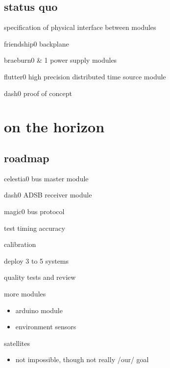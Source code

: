 \subsection{status quo}
  \begin{frame}{specification of physical interface between modules}
	\end{frame}
	\begin{frame}{friendship0 backplane}
	\end{frame}
	\begin{frame}{braeburn0 \& 1 power supply modules}
	\end{frame}
	\begin{frame}{flutter0 high precision distributed time source module}
	\end{frame}
	\begin{frame}{dash0 proof of concept}
	\end{frame}

\section{on the horizon}	

\subsection{roadmap}
	\begin{frame}{celestia0 bus master module}
	\end{frame}
	\begin{frame}{dash0 ADSB receiver module}
	\end{frame}
	\begin{frame}{magic0 bus protocol}
	\end{frame}
	\begin{frame}{test timing accuracy}
	\end{frame}
	\begin{frame}{calibration}
	\end{frame}
	\begin{frame}{deploy 3 to 5 systems}
	\end{frame}
	\begin{frame}{quality tests and review}
	\end{frame}
	\begin{frame}{more modules}
		\begin{itemize}
			\item arduino module
			\item environment sensors
		\end{itemize}
	\end{frame}
	\begin{frame}{satellites}
		\begin{itemize}
			\item not impossible, though not really /our/ goal
		\end{itemize}
	\end{frame}

